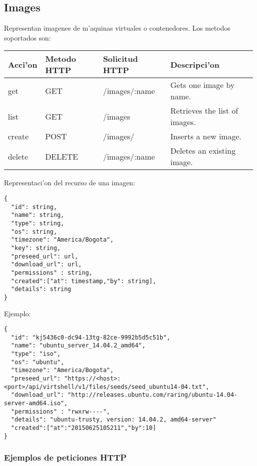 \subsection{Images}
Representan imagenes de m'aquinas virtuales o contenedores. Los metodos soportados son:

\begin{center}
 \begin{tabular}{| l | l | l | l |}
 \hline
  \rowcolor{blueapi}
  \textbf{Acci'on} & \textbf{Metodo HTTP} & \textbf{Solicitud HTTP} & \textbf{Descripci'on} \\ [0.5ex] 
  \hline\hline
  get & GET & /images/:name & Gets one image by name. \\
  \hline
  list & GET & /images & Retrieves the list of images. \\
  \hline  
  create & POST & /images/ & Inserts a new image. \\
  \hline
  delete & DELETE & /images/:name & Deletes an existing image. \\ [1ex] 
  \hline
\end{tabular}
\end{center}

\vspace{1cm}
Representaci'on del recurso de una imagen:
\vspace{1cm}

\begin{lstlisting}[style=json]
{
  "id": string,
  "name": string,
  "type": string,
  "os": string,
  "timezone": "America/Bogota", 
  "key": string,
  "preseed_url": url,
  "download_url": url,
  "permissions" : string,
  "created":["at": timestamp,"by": string],
  "details": string
}
\end{lstlisting}

Ejemplo:

\medskip
\begin{lstlisting}[style=json]
{
  "id": "kj5436c0-dc94-13tg-82ce-9992b5d5c51b",
  "name": "ubuntu_server_14.04.2_amd64",
  "type": "iso",
  "os": "ubuntu",
  "timezone": "America/Bogota",
  "preseed_url": "https://<host>:<port>/api/virtshell/v1/files/seeds/seed_ubuntu14-04.txt",
  "download_url": "http://releases.ubuntu.com/raring/ubuntu-14.04-server-amd64.iso",
  "permissions" : "rwxrw----",
  "details": "ubuntu-trusty, version: 14.04.2, amd64-server"
  "created":["at":"20150625105211","by":10]
}
\end{lstlisting}

\subsubsection{Ejemplos de peticiones HTTP}

